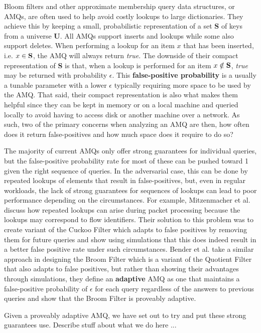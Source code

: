 \documentclass[../paper.tex]{subfiles}
\begin{document}
    Bloom filters and other approximate membership query data structures, or
    AMQs, are often used to help avoid costly lookups to large dictionaries.
    They achieve this by keeping a small, probabilistic representation of a set
    {\bf S} of keys from a universe {\bf U}.  All AMQs support inserts and lookups
    while some also support deletes.  When performing a lookup for an item $x$
    that has been inserted, i.e. $x\in {\bf S}$, the AMQ will always return
    {\it true}.  The downside of their compact representation of {\bf S} is
    that, when a lookup is performed for an item $x \notin {\bf S}$, {\it true}
    may be returned with probability $\epsilon$.  This {\bf false-positive
    probability} is a usually a tunable parameter with a lower $\epsilon$
    typically requiring more space to be used by the AMQ.  That said, their
    compact representation is also what makes them helpful since they can be
    kept in memory or on a local machine and queried locally to avoid having to
    access disk or another machine over a network.  As such, two of the primary
    concerns when analyzing an AMQ are then, how often does it return
    false-positives and how much space does it require to do so?

    The majority of current AMQs only offer strong guarantees for individual
    queries, but the false-positive probability rate for most of these can be
    pushed toward 1 given the right sequence of queries.  In the adversarial
    case, this can be done by repeated lookups of elements that result in
    false-positives, but, even in regular workloads, the lack of strong
    guarantees for sequences of lookups can lead to poor performance depending
    on the circumstances.  For example, Mitzenmacher et al.
    \cite{adaptive-cuckoo} discuss how repeated lookups can arise during packet
    processing because the lookups may correspond to flow identifiers.  Their
    solution to this problem was to create variant of the Cuckoo Filter
    \cite{cuckoo-filter} which adapts to false positives by removing them for
    future queries and show using simulations that this does indeed result in a
    better false positive rate under such circumstances.  Bender et al.
    \cite{broom-filter} take a similar approach in designing the Broom Filter
    which is a variant of the Quotient Filter \cite{quotient-filter} that also
    adapts to false positives, but rather than showing their advantages through
    simulations, they define an {\bf adaptive} AMQ as one that maintains a
    false-positive probability of $\epsilon$ for each query regardless of the
    answers to previous queries and show that the Broom Filter is proveably
    adaptive.
	
    Given a proveably adaptive AMQ, we have set out to try and put these strong
    guarantees use.  Describe stuff about what we do here ...
\end{document}
